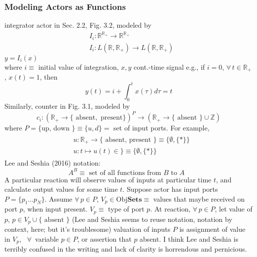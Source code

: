 \documentclass[10pt]{amsart}
\begin{document}
\begin{multicols*}{2}
\subsubsection{Modeling Actors as Functions}
integrator actor in Sec. 2.2, Fig. 3.2, modeled by 
\[
\begin{aligned}
& I_i : \mathbb{R}^{\mathbb{R}_+} \to \mathbb{R}^{\mathbb{R}_+} \\ 
&  I_i : L(\mathbb{R}, \mathbb{R}_+ ) \to L(\mathbb{R}, \mathbb{R}_+)
\end{aligned}
\]
$y= I_i(x)$  \\
where $i\equiv $ initial value of integration, $x,y$ cont.-time signal 
e.g., if $i=0$, $\forall \, t \in \mathbb{R}_+$, $x(t) = 1$, then 
\[
y(t) = i + \int_0^t x(\tau ) d\tau = t
\]
Similarly, counter in Fig. 3.1, modeled by 
\[
c_i : (\mathbb{R}_+ \to \lbrace \text{ absent} , \text{ present} \rbrace )^P \to (\mathbb{R}_+ \to \lbrace \text{ absent } \rbrace \cup \mathbb{Z})
\]
where $P = \lbrace \text{up, down } \rbrace \equiv \lbrace u ,d \rbrace = $ set of input ports.  
For example, 
\[
\begin{gathered}
\begin{aligned}
& u: \mathbb{R}_+ \to \lbrace \text{ absent, present } \rbrace \equiv \lbrace \emptyset , \lbrace * \rbrace \rbrace \\ 
& u: t \mapsto u(t) \in  \rbrace \equiv \lbrace \emptyset , \lbrace * \rbrace \rbrace 
\end{aligned}
\end{gathered}
\]
Lee and Seshia (2016) \cite{LeSe2016} notation: 
\[
A^B \equiv  \text{ set of all functions from $B$ to $A$ }
\]
A particular reaction will observe values of inputs at particular time $t$, and calculate output values for some time $t$.  
Suppose actor has input ports $P = \lbrace p_1 \dots p_N \rbrace$.  
Assume $\forall \, p \in P$, $V_p \in \text{Obj} \textbf{Sets} \equiv $ values that maybe received on port $p$, when input present.  
$V_p \equiv $ type of port $p$.  
At reaction, $\forall \, p \in P$, let value of $p$, $p\in V_p \cup \lbrace \text{ absent } \rbrace$ (Lee and Seshia seems to reuse notation, notation by context, here; but it's troublesome)
valuation of inputs $P$ is assignment of value in $V_p$, \, $\forall \, $ variable $p\in P$, or assertion that $p $ absent.  
I think Lee and Seshia is terribly confused in the writing and lack of clarity is horrendous and pernicious.  



\end{multicols*}
\end{document}
